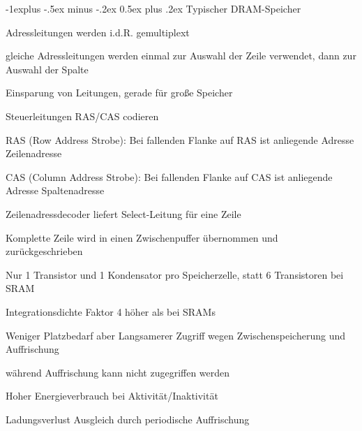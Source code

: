 \documentclass[10pt,landscape]{article}
\makeatletter
\renewcommand{\subsection}{\@startsection{subsection}{2}{0mm}%
                                {-1explus -.5ex minus -.2ex}%
                                {0.5ex plus .2ex}%
                                {\normalfont\normalsize\bfseries}}
\makeatother
\begin{document}
\begin{multicols}{3}
  \subsection{Typischer DRAM-Speicher}
  \begin{itemize*}
    \item Adressleitungen werden i.d.R. gemultiplext
    \item gleiche Adressleitungen werden einmal zur Auswahl der Zeile verwendet, dann zur Auswahl der Spalte
    \item Einsparung von Leitungen, gerade für große Speicher
    \item Steuerleitungen RAS/CAS codieren
    \item RAS (Row Address Strobe): Bei fallenden Flanke auf RAS ist anliegende Adresse Zeilenadresse
    \item CAS (Column Address Strobe): Bei fallenden Flanke auf CAS ist anliegende Adresse Spaltenadresse
    \item Zeilenadressdecoder liefert Select-Leitung für eine Zeile
    \item Komplette Zeile wird in einen Zwischenpuffer übernommen und zurückgeschrieben
    \item Nur 1 Transistor und 1 Kondensator pro Speicherzelle, statt 6 Transistoren bei SRAM
    \item Integrationsdichte Faktor 4 höher als bei SRAMs
    \item Weniger Platzbedarf aber Langsamerer Zugriff wegen Zwischenspeicherung und Auffrischung
    \item während Auffrischung kann nicht zugegriffen werden
    \item Hoher Energieverbrauch bei Aktivität/Inaktivität
    \item Ladungsverlust Ausgleich durch periodische Auffrischung
  \end{itemize*}
  

\end{multicols}
\end{document}
